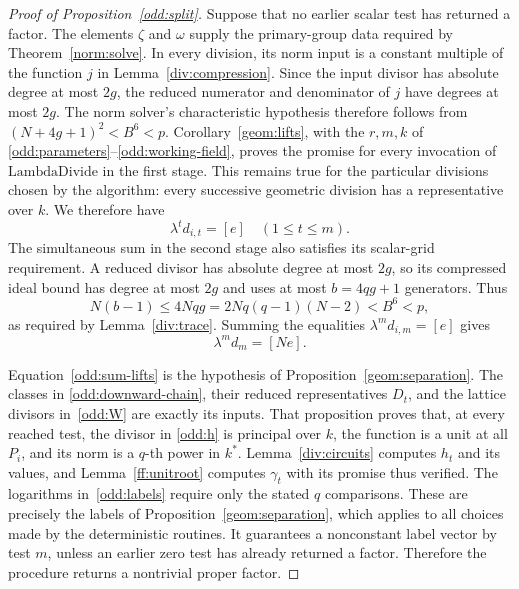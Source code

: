 \begin{proof}[Proof of Proposition~\ref{odd:split}]
Suppose that no earlier scalar test has returned a factor.
The elements $\zeta$ and $\omega$ supply the primary-group data required
by Theorem~\ref{norm:solve}.  In every division, its norm input is a
constant multiple of the function $j$ in Lemma~\ref{div:compression}.
Since the input divisor has absolute degree at most $2g$, the reduced
numerator and denominator of $j$ have degrees at most $2g$.
The norm solver's characteristic hypothesis therefore follows from
$(N+4g+1)^2<B^6<p$.
Corollary~\ref{geom:lifts}, with the $r,m,k$ of
\eqref{odd:parameters}--\eqref{odd:working-field}, proves the promise for
every invocation of $\mathrm{LambdaDivide}$ in the first stage.
This remains true for the particular divisions chosen by the algorithm:
every successive geometric division has a representative over $k$.
We therefore have
\[
                       \lambda^t d_{i,t}=[e]
                       \quad(1\le t\le m).
\]
The simultaneous sum in the second stage also satisfies its scalar-grid
requirement.  A reduced divisor has absolute degree at most $2g$, so its
compressed ideal bound has degree at most $2g$ and uses at most
$b=4qg+1$ generators.  Thus
\[
             N(b-1)\le 4Nqg
                  =2Nq(q-1)(N-2)<B^6<p,
\]
as required by Lemma~\ref{div:trace}.
Summing the equalities $\lambda^m d_{i,m}=[e]$ gives
\begin{equation}
                              \lambda^m d_m=[Ne].
\label{odd:sum-lifts}
\end{equation}

Equation~\eqref{odd:sum-lifts} is the hypothesis of
Proposition~\ref{geom:separation}.  The classes in
\eqref{odd:downward-chain}, their reduced representatives $D_t$, and
the lattice divisors in~\eqref{odd:W} are exactly its inputs.
That proposition proves that, at every reached test, the divisor in
\eqref{odd:h} is principal over $k$, the function is a unit at all
$P_i$, and its norm is a $q$-th power in $k^*$.
Lemma~\ref{div:circuits} computes $h_t$ and its values, and
Lemma~\ref{ff:unitroot} computes $\gamma_t$ with its promise thus
verified.  The logarithms in~\eqref{odd:labels} require only the stated
$q$ comparisons.
These are precisely the labels of Proposition~\ref{geom:separation},
which applies to all choices made by the deterministic routines.
It guarantees a nonconstant label vector by test $m$, unless an earlier
zero test has already returned a factor.  Therefore the procedure returns
a nontrivial proper factor.


\end{proof}
